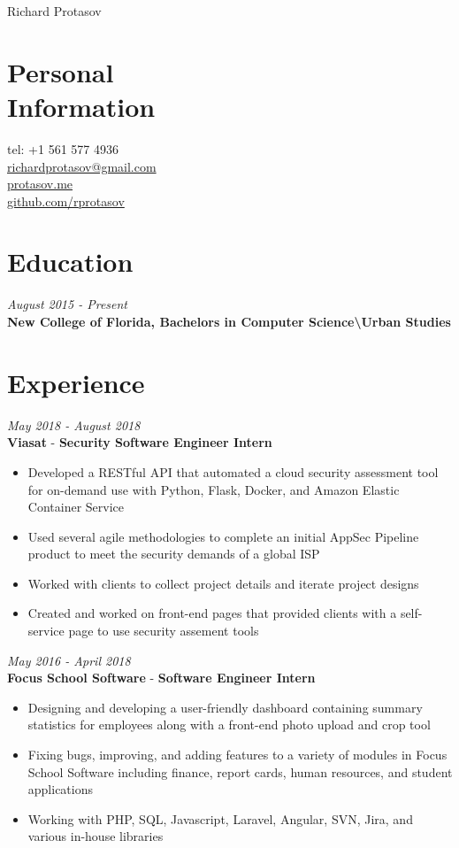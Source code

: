 \documentclass[margin,line,a4paper]{resume}
\begin{document}
{\sc \Huge Richard Protasov}
\begin{resume}
    \vspace{0cm}

    \section{\mysidestyle Personal\\Information}
    tel: +1 561 577 4936 \\
    \href{mailto:richardprotasov@gmail.com}{richardprotasov@gmail.com} \\
    \href{https://protasov.me}{protasov.me}\\
    \href{https://github.com/rprotasov}{github.com/rprotasov}
    
    \section{\mysidestyle Education}
        \textit{August 2015 - Present}\\
        \textbf{New College of Florida, Bachelors in Computer Science\textbackslash Urban Studies}
        
    \section{\mysidestyle Experience}
        \textit{May 2018 - August 2018}\\
        \textbf{Viasat} - \textbf{Security Software Engineer Intern}
        \begin{itemize}
            \item Developed a RESTful API that automated a cloud security assessment tool for on-demand use with Python, Flask, Docker, and Amazon Elastic Container Service
            \item Used several agile methodologies to complete an initial AppSec Pipeline product to meet the security demands of a global ISP
            \item Worked with clients to collect project details and iterate project designs
            \item Created and worked on front-end pages that provided clients with a self-service page to use security assement tools
        \end{itemize}

        \textit{May 2016 - April 2018}\\
        \textbf{Focus School Software} - \textbf{Software Engineer Intern}
        \begin{itemize}
            \item Designing and developing a user-friendly dashboard containing summary statistics for employees along with a front-end photo upload and crop tool
            \item Fixing bugs, improving, and adding features to a variety of modules in Focus School Software including finance, report cards, human resources, and student applications
            \item Working with PHP, SQL, Javascript, Laravel, Angular, SVN, Jira, and various in-house libraries
        \end{itemize}
            

\end{resume}
\end{document}
